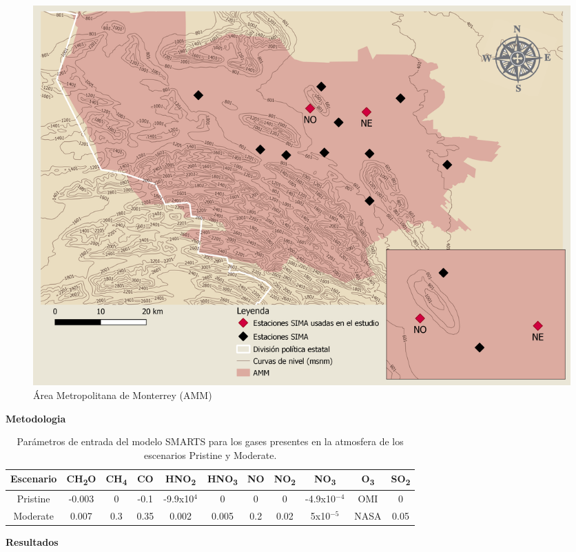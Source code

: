 \documentclass{article}
\begin{document}
\begin{minipage}{0.47\linewidth}
\begin{figure}[H]
\centering
\includegraphics[scale=0.375]{images/AMM10.png}
\caption{Área Metropolitana de Monterrey (AMM)}
\end{figure}
\end{minipage}
\begin{center}
\begin{shaded}
\textbf{\textcolor{ver}{Metodologia}}
\end{shaded}
\end{center}
\begin{table}[H]
    \centering
    \begin{tabular}{ccccccccccc} 
         Escenario & CH\textsubscript{2}O & CH\textsubscript{4}& CO & HNO\textsubscript{2} & HNO\textsubscript{3} & NO & NO\textsubscript{2} & NO\textsubscript{3} & O\textsubscript{3} & SO\textsubscript{2}\\ \hline
       Pristine &-0.003 & 0  &-0.1  &-9.9x10$^{4}$& 0  &      0&    0  &    -4.9x10$^{-4}$  & OMI & 0 \\ \cline{1-9} \cline{11-11}
       Moderate & 0.007 & 0.3& 0.35    &   0.002  &  0.005 & 0.2 & 0.02 & 5x10$^{-5}$ & NASA &0.05 \\ \hline
    \end{tabular}
    \caption{Parámetros de entrada del modelo SMARTS para los gases presentes en la atmosfera de los escenarios Pristine y Moderate.}
\end{table}
\begin{center}
\begin{shaded}
\textbf{\textcolor{ver}{Resultados}}
\end{shaded}
\end{center}
\end{document}
